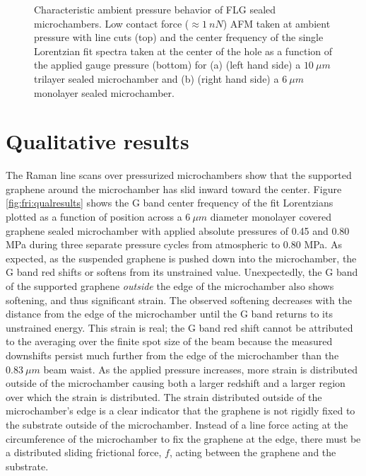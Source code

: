 \begin{figure}
	\begin{center}
	
	\end{center}
	\caption[Characteristic ambient pressure behavior of FLG sealed microchambers]{\label{fig:fri:ambient}Characteristic ambient pressure behavior of FLG sealed microchambers. Low contact force ($\approx 1\ nN$) AFM taken at ambient pressure with line cuts (top) and the center frequency of the single Lorentzian fit spectra taken at the center of the hole as a function of the applied gauge pressure (bottom) for (a) (left hand side) a $10 \ \mu m$ trilayer sealed microchamber and (b) (right hand side) a $6 \ \mu m$ monolayer sealed microchamber.}
\end{figure}

\section{Qualitative results}
The Raman line scans over pressurized microchambers show that the supported graphene around the microchamber has slid inward toward the center.
Figure \ref{fig:fri:qualresults} shows the G band center frequency of the fit Lorentzians plotted as a function of position across a $6 \ \mu m$ diameter monolayer covered graphene sealed microchamber with applied absolute pressures of 0.45 and 0.80 MPa during three separate pressure cycles from atmospheric to 0.80 MPa.
As expected, as the suspended graphene is pushed down into the microchamber, the G band red shifts or softens from its unstrained value.
Unexpectedly, the G band of the supported graphene \emph{outside} the edge of the microchamber also shows softening, and thus significant strain.
The observed softening decreases with the distance from the edge of the microchamber until the G band returns to its unstrained energy.
This strain is real; the G band red shift cannot be attributed to the averaging over the finite spot size of the beam because the measured downshifts persist much further from the edge of the microchamber than the $0.83 \ \mu m$ beam waist.
As the applied pressure increases, more strain is distributed outside of the microchamber causing both a larger redshift and a larger region over which the strain is distributed.
The strain distributed outside of the microchamber's edge is a clear indicator that the graphene is not rigidly fixed to the substrate outside of the microchamber.
Instead of a line force acting at the circumference of the microchamber to fix the graphene at the edge, there must be a distributed sliding frictional force, $f$, acting between the graphene and the substrate.

